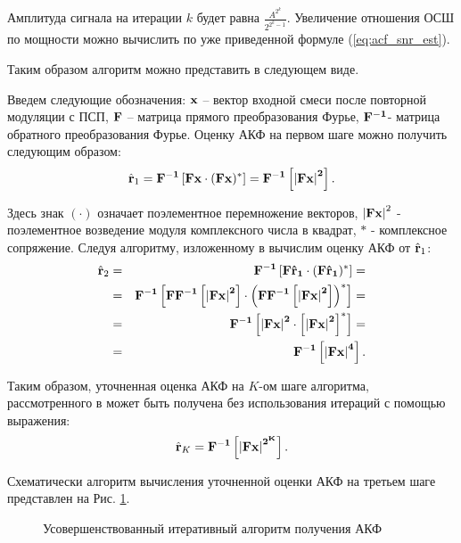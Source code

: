 Амплитуда сигнала на итерации ${k}$ будет равна ${\frac{A^{2^k}}{2^{2^k-1}}}$. Увеличение отношения ОСШ по мощности можно
вычислить по уже приведенной формуле (\ref{eq:acf_snr_est}). 

Таким образом алгоритм можно представить в следующем виде.

Введем следующие обозначения: ${\bf{x}}$ – вектор входной смеси после повторной модуляции с ПСП, ${\bf{F}}$ – матрица прямого преобразования Фурье,
${\bf{F}^{-1}}$- матрица обратного преобразования Фурье.  Оценку АКФ на первом шаге можно получить следующим образом:
\begin{equation}
	\label{eq:akf_1}
	\hat{\bf{r}}_1 = \bf{F}^{-1}\left[ \bf{Fx} \cdot (\bf{Fx})^* \right] = \bf{F}^{-1} \left[ \left| \bf{Fx} \right| ^2 \right].
\end{equation}

Здесь знак ${(\cdot)}$  означает поэлементное перемножение векторов, ${\left| \bf{Fx} \right| ^2}$ - поэлементное возведение модуля комплексного числа в квадрат, ${*}$ -
комплексное сопряжение.  Следуя алгоритму, изложенному в \cite{ostanin_akf} вычислим оценку АКФ от ${\hat{\bf{r}}_1}$:
\begin{eqnarray}
	\label{eq:akf_2}
	\hat{\bf{r}}_2 & = & \bf{F}^{-1}\left[ \bf{F} \hat{\bf{r}}_1 \cdot (\bf{F} \hat{\bf{r}}_1)^* \right] = \nonumber \\
		& = & \bf{F}^{-1}	\left[ 
				\bf{FF}^{-1} \left[
						\left| \bf{Fx} \right| ^2
					\right]
						\cdot \left( \bf{FF}^{-1} \left[ \left| \bf{Fx} \right| ^2 \right]
					\right) ^*
			\right] = \nonumber \\
		& = & \bf{F}^{-1} \left[ \left| \bf{Fx} \right| ^2 \cdot \left[ \left| \bf{Fx} \right| ^2 \right] ^* \right] =  \nonumber \\
		& = & \bf{F}^{-1} \left[ \left| \bf{Fx} \right| ^4 \right].
\end{eqnarray}

Таким образом, уточненная оценка АКФ на ${K}$-ом шаге алгоритма, рассмотренного в \cite{ostanin_akf}
может быть получена без использования итераций с помощью выражения:
\begin{equation}
	\label{eq:akf_3}
	\hat{\bf{r}}_K = \bf{F}^{-1}\left[ \left| \bf{Fx} \right| ^{2^K} \right].
\end{equation}

Схематически алгоритм вычисления уточненной оценки АКФ на третьем шаге представлен на Рис. \ref{pic:akf_pic}.

\begin{figure}[h]
	\center{}
	\caption{Усовершенствованный итеративный алгоритм получения АКФ}
	\label{pic:akf_pic}
\end{figure}

